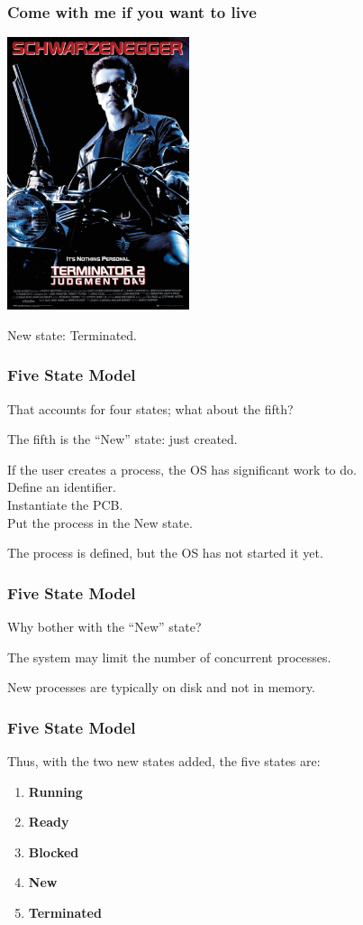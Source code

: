 \begin{frame}
\frametitle{Come with me if you want to live}

\begin{center}
\includegraphics[width=0.4\textwidth]{images/judgement-day.jpg}
\end{center}

New state: Terminated.

\end{frame}


\begin{frame}
\frametitle{Five State Model}
That accounts for four states; what about the fifth?

The fifth is the ``New'' state: just created.

If the user creates a process, the OS has significant work to do.\\
\quad Define an identifier.\\
\quad Instantiate the PCB.\\
\quad Put the process in the New state.

The process is defined, but the OS has not started it yet.

\end{frame}

\begin{frame}
\frametitle{Five State Model}
Why bother with the ``New'' state?

The system may limit the number of concurrent processes.

New processes are typically on disk and not in memory.

\end{frame}

\begin{frame}
\frametitle{Five State Model}

Thus, with the two new states added, the five states are:

\begin{enumerate}
 \item \textbf{Running}
 \item \textbf{Ready}
 \item \textbf{Blocked}
 \item \textbf{New}
 \item \textbf{Terminated}
\end{enumerate}

\end{frame}


